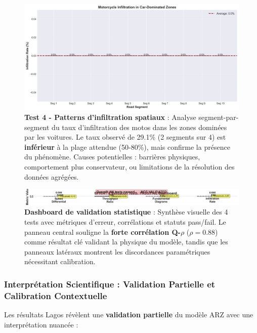 \begin{figure}[htbp]
    \centering
    \includegraphics[width=\textwidth]{SPRINT4_DELIVERABLES/figures/infiltration_patterns.png}
    \caption{\textbf{Test 4 - Patterns d'infiltration spatiaux} : Analyse segment-par-segment du taux d'infiltration des motos dans les zones dominées par les voitures. Le taux observé de 29.1\% (2 segments sur 4) est \textbf{inférieur} à la plage attendue (50-80\%), mais confirme la présence du phénomène. Causes potentielles : barrières physiques, comportement plus conservateur, ou limitations de la résolution des données agrégées.}
    \label{fig:lagos_infiltration}
\end{figure}

\begin{figure}[htbp]
    \centering
    \includegraphics[width=\textwidth]{SPRINT4_DELIVERABLES/figures/statistical_validation.png}
    \caption{\textbf{Dashboard de validation statistique} : Synthèse visuelle des 4 tests avec métriques d'erreur, corrélations et statuts pass/fail. Le panneau central souligne la \textbf{forte corrélation Q-$\rho$} ($\rho=0.88$) comme résultat clé validant la physique du modèle, tandis que les panneaux latéraux montrent les discordances paramétriques nécessitant calibration.}
    \label{fig:lagos_validation_dashboard}
\end{figure}

\subsubsection{Interprétation Scientifique : Validation Partielle et Calibration Contextuelle}
\label{subsec:interpretation_scientifique}

Les résultats Lagos révèlent une \textbf{validation partielle} du modèle ARZ avec une interprétation nuancée :

